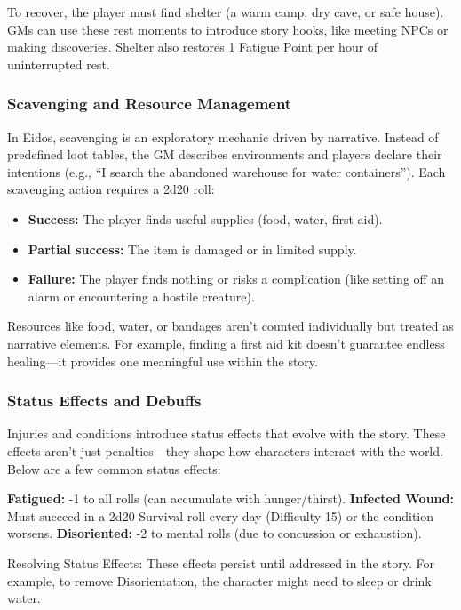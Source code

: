 To recover, the player must find shelter (a warm camp, dry cave, or safe
house). GMs can use these rest moments to introduce story hooks, like
meeting NPCs or making discoveries. Shelter also restores 1 Fatigue
Point per hour of uninterrupted rest.

\hypertarget{scavenging-and-resource-management}{%
\subsubsection{Scavenging and Resource
Management}\label{scavenging-and-resource-management}}

In Eidos, scavenging is an exploratory mechanic driven by narrative.
Instead of predefined loot tables, the GM describes environments and
players declare their intentions (e.g., ``I search the abandoned
warehouse for water containers''). Each scavenging action requires a
2d20 roll:

\begin{itemize}
\tightlist
\item
  \textbf{Success:} The player finds useful supplies (food, water, first
  aid).
\item
  \textbf{Partial success:} The item is damaged or in limited supply.
\item
  \textbf{Failure:} The player finds nothing or risks a complication
  (like setting off an alarm or encountering a hostile creature).
\end{itemize}

Resources like food, water, or bandages aren't counted individually but
treated as narrative elements. For example, finding a first aid kit
doesn't guarantee endless healing---it provides one meaningful use
within the story.

\hypertarget{status-effects-and-debuffs}{%
\subsubsection{Status Effects and
Debuffs}\label{status-effects-and-debuffs}}

Injuries and conditions introduce status effects that evolve with the
story. These effects aren't just penalties---they shape how characters
interact with the world. Below are a few common status effects:

\textbf{Fatigued:} -1 to all rolls (can accumulate with hunger/thirst).
\textbf{Infected Wound:} Must succeed in a 2d20 Survival roll every day
(Difficulty 15) or the condition worsens. \textbf{Disoriented:} -2 to
mental rolls (due to concussion or exhaustion).

Resolving Status Effects: These effects persist until addressed in the
story. For example, to remove Disorientation, the character might need
to sleep or drink water.
